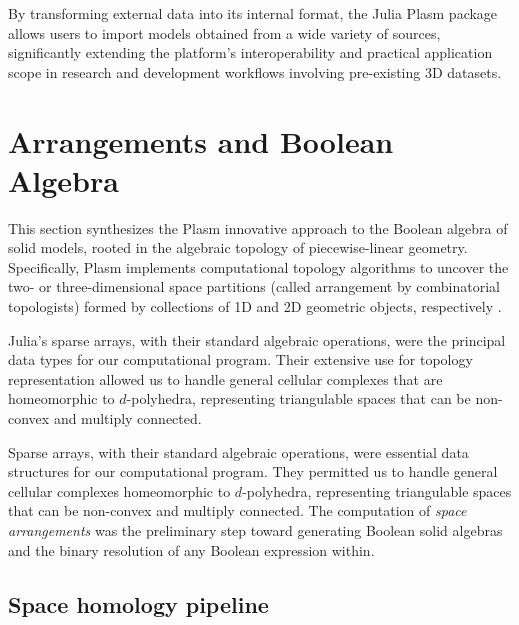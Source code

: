\documentclass{juliacon}
\begin{document}
By transforming external data into its internal format, the Julia Plasm package allows users to import models obtained from a wide variety of sources, significantly extending the platform's interoperability and practical application scope in research and development workflows involving pre-existing 3D datasets.


\section{Arrangements and Boolean Algebra}
\label{sec:additional_doc}

This section synthesizes the Plasm innovative approach to the Boolean algebra of solid models, rooted in the algebraic topology of piecewise-linear geometry. Specifically, Plasm implements computational topology algorithms to uncover the two- or three-dimensional space partitions (called arrangement by combinatorial topologists) formed by collections of 1D and 2D geometric objects, respectively \cite{Plasm:book:2005}.

Julia’s sparse arrays, with their standard algebraic operations, were the principal data types for our computational program. Their extensive use \cite{TSAS:2020} for topology representation allowed us to handle general cellular complexes that are homeomorphic to $d$-polyhedra, representing triangulable spaces that can be non-convex and multiply connected.

Sparse arrays, with their standard algebraic operations, were essential data structures for our computational program. They permitted us to handle general cellular complexes homeomorphic to $d$-polyhedra, representing triangulable spaces that can be non-convex and multiply connected. The computation of \emph{space arrangements} was the preliminary step toward generating Boolean solid algebras and the binary resolution of any Boolean expression within.

\subsection{Space homology pipeline}
\label{subsec:title_auth}
\end{document}
